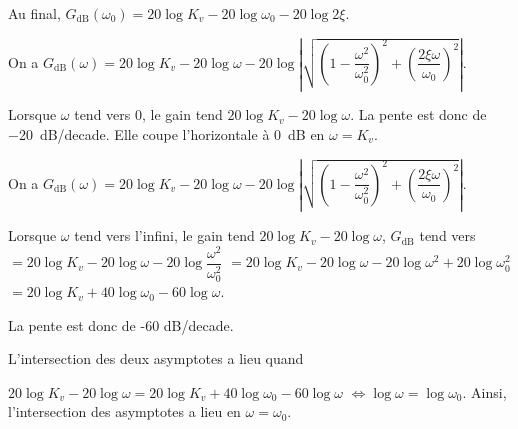 \begin{multicols}{2}
\begin{corrige}
Au final, 
$G_{\text{dB}}\left(\omega_0 \right)=
20\log K_v- 20\log  \omega_0 - 20\log 2\xi $.
\end{corrige} \else \fi


\ifprof \begin{corrige}
On a $G_{\text{dB}}\left(\omega \right)
=20\log K_v- 20\log  \omega - 20\log  \left| \sqrt{\left(1- \dfrac{\omega^2}{\omega_0^2} \right)^2+\left( \dfrac{2\xi\omega }{\omega_0} \right)^2} \right|$. 

Lorsque $\omega$ tend vers 0, le gain tend $20\log K_v- 20\log  \omega$.
 La pente est donc de \SI{-20}{dB/decade}. Elle coupe l'horizontale à \SI{0}{dB} en $\omega=K_v$.

\end{corrige} \else \fi



\ifprof \begin{corrige}
On a $G_{\text{dB}}\left(\omega \right)
=20\log K_v- 20\log  \omega - 20\log  \left| \sqrt{\left(1- \dfrac{\omega^2}{\omega_0^2} \right)^2+\left( \dfrac{2\xi\omega }{\omega_0} \right)^2} \right|$. 

Lorsque $\omega$ tend vers l'infini, le gain tend $20\log K_v- 20\log  \omega$, 
$G_{\text{dB}}$ tend vers 
$= 20\log K_v- 20\log  \omega - 20\log  \dfrac{\omega^2}{\omega_0^2} $
$= 20\log K_v- 20\log  \omega - 20\log  \omega^2 +20\log  \omega_0^2 $
$= 20\log K_v+ 40\log  \omega_0 - 60\log  \omega $.

La pente est donc de -60 dB/decade.

L'intersection des deux asymptotes a lieu quand 

$20\log K_v- 20\log  \omega= 20\log K_v+40\log  \omega_0 - 60\log  \omega$
$\Leftrightarrow \log  \omega= \log  \omega_0 $. Ainsi, l'intersection des asymptotes a lieu en $\omega=\omega_0$. 
\end{corrige} \else \fi



\end{multicols}
